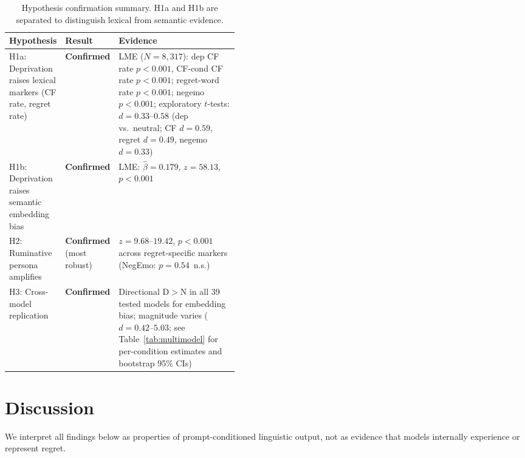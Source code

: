 \documentclass[conference,10pt]{IEEEtran}
\begin{document}
\begin{table}[t]
\caption{Hypothesis confirmation summary. H1a and H1b are separated to distinguish lexical from semantic evidence.}
\label{tab:hypothesis}
\footnotesize\centering
\begin{tabularx}{\linewidth}{@{}>{\RaggedRight\arraybackslash}p{0.24\linewidth}
>{\RaggedRight\arraybackslash}p{0.20\linewidth}
>{\RaggedRight\arraybackslash}X@{}}
\toprule
\rowcolor{tableheader}
\textbf{Hypothesis} & \textbf{Result} & \textbf{Evidence} \\
\midrule
H1a: Deprivation raises lexical markers (CF rate, regret rate) & \textbf{Confirmed} & LME ($N=8{,}317$): dep CF rate $p<0.001$, CF-cond CF rate $p<0.001$; regret-word rate $p<0.001$; negemo $p<0.001$; exploratory $t$-tests: $d=0.33$--$0.58$ (dep vs.\ neutral; CF $d=0.59$, regret $d=0.49$, negemo $d=0.33$) \\
H1b: Deprivation raises semantic embedding bias & \textbf{Confirmed} & LME: $\hat{\beta}=0.179$, $z=58.13$, $p<0.001$ \\
H2: Ruminative persona amplifies & \textbf{Confirmed} (most robust) & $z=9.68$--$19.42$, $p<0.001$ across regret-specific markers (NegEmo: $p=0.54$~n.s.) \\
H3: Cross-model replication & \textbf{Confirmed} & Directional D$>$N in all 39 tested models for embedding bias; magnitude varies ($d=0.42$--$5.03$; see Table~\ref{tab:multimodel} for per-condition estimates and bootstrap 95\% CIs) \\
\bottomrule
\end{tabularx}
\end{table}

\section{Discussion}

We interpret all findings below as properties of prompt-conditioned linguistic output, not as evidence that models internally experience or represent regret.
\end{document}
